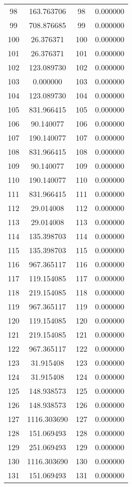 \documentclass[12pt]{article}
\begin{document}
\begin{longtable}{@{}cccc@{}}
98 & 163.763706 & 98 & 0.000000 \\
99 & 708.876685 & 99 & 0.000000 \\
100 & 26.376371 & 100 & 0.000000 \\
101 & 26.376371 & 101 & 0.000000 \\
102 & 123.089730 & 102 & 0.000000 \\
103 & 0.000000 & 103 & 0.000000 \\
104 & 123.089730 & 104 & 0.000000 \\
105 & 831.966415 & 105 & 0.000000 \\
106 & 90.140077 & 106 & 0.000000 \\
107 & 190.140077 & 107 & 0.000000 \\
108 & 831.966415 & 108 & 0.000000 \\
109 & 90.140077 & 109 & 0.000000 \\
110 & 190.140077 & 110 & 0.000000 \\
111 & 831.966415 & 111 & 0.000000 \\
112 & 29.014008 & 112 & 0.000000 \\
113 & 29.014008 & 113 & 0.000000 \\
114 & 135.398703 & 114 & 0.000000 \\
115 & 135.398703 & 115 & 0.000000 \\
116 & 967.365117 & 116 & 0.000000 \\
117 & 119.154085 & 117 & 0.000000 \\
118 & 219.154085 & 118 & 0.000000 \\
119 & 967.365117 & 119 & 0.000000 \\
120 & 119.154085 & 120 & 0.000000 \\
121 & 219.154085 & 121 & 0.000000 \\
122 & 967.365117 & 122 & 0.000000 \\
123 & 31.915408 & 123 & 0.000000 \\
124 & 31.915408 & 124 & 0.000000 \\
125 & 148.938573 & 125 & 0.000000 \\
126 & 148.938573 & 126 & 0.000000 \\
127 & 1116.303690 & 127 & 0.000000 \\
128 & 151.069493 & 128 & 0.000000 \\
129 & 251.069493 & 129 & 0.000000 \\
130 & 1116.303690 & 130 & 0.000000 \\
131 & 151.069493 & 131 & 0.000000 \\

\end{longtable}
\end{document}
